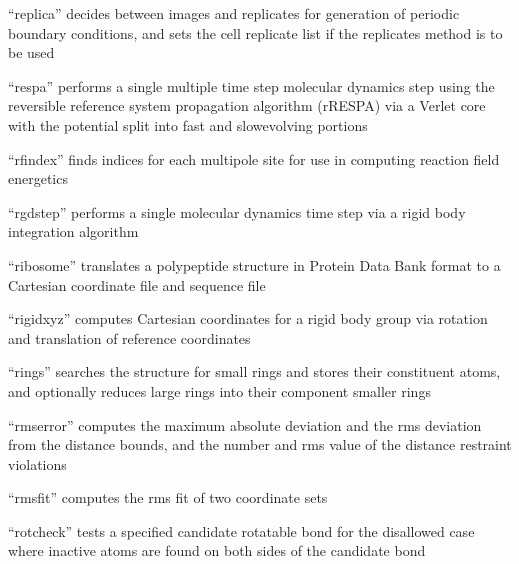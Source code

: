 \documentclass[letterpaper,11pt,english]{sphinxmanual}
\begin{document}

“replica” decides between images and replicates for generation
of periodic boundary conditions, and sets the cell replicate
list if the replicates method is to be used


“respa” performs a single multiple time step molecular dynamics
step using the reversible reference system propagation algorithm
(r\sphinxhyphen{}RESPA) via a Verlet core with the potential split into fast\sphinxhyphen{}
and slow\sphinxhyphen{}evolving portions


“rfindex” finds indices for each multipole site for use
in computing reaction field energetics


“rgdstep” performs a single molecular dynamics time step
via a rigid body integration algorithm


“ribosome” translates a polypeptide structure in Protein Data
Bank format to a Cartesian coordinate file and sequence file


“rigidxyz” computes Cartesian coordinates for a rigid body
group via rotation and translation of reference coordinates


“rings” searches the structure for small rings and stores
their constituent atoms, and optionally reduces large rings
into their component smaller rings


“rmserror” computes the maximum absolute deviation and the
rms deviation from the distance bounds, and the number and
rms value of the distance restraint violations


“rmsfit” computes the rms fit of two coordinate sets



“rotcheck” tests a specified candidate rotatable bond for
the disallowed case where inactive atoms are found on both
sides of the candidate bond
\end{document}
